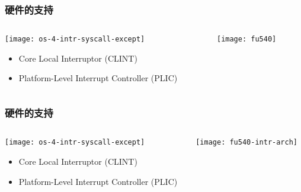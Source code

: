 \begin{frame}[plain]
	\frametitle{硬件的支持}
	\begin{columns}
		
		\begin{column}{0.4\textwidth}
			\centering
			\texttt{[image: os-4-intr-syscall-except]}
			\begin{itemize} \small
				\item Core Local	Interruptor (CLINT)
				\item Platform-Level Interrupt Controller (PLIC)
		    \end{itemize}
		\end{column}
		
		\begin{column}{0.6\textwidth}
			
			\centering
			\texttt{[image: fu540]}	
			
			
		\end{column}
		
	\end{columns}
	
\end{frame}


\begin{frame}[plain]
	\frametitle{硬件的支持}
	\begin{columns}
		
		\begin{column}{0.4\textwidth}
			\centering
			\texttt{[image: os-4-intr-syscall-except]}
			\begin{itemize} \small
				\item Core Local	Interruptor (CLINT)
				\item Platform-Level Interrupt Controller (PLIC)
			\end{itemize}
			
		\end{column}
		
		\begin{column}{0.6\textwidth}
			
			\centering
			\texttt{[image: fu540-intr-arch]}	
			
			
		\end{column}
		
	\end{columns}
	
\end{frame}


